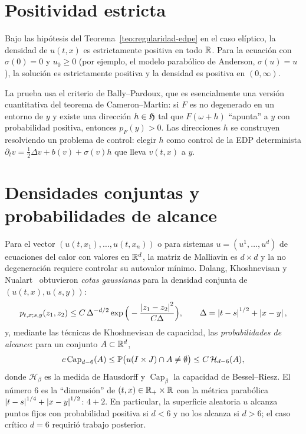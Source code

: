 \section{Positividad estricta}

\begin{teorema}
Bajo las hipótesis del Teorema~\ref{teo:regularidad-edpe} en el caso elíptico, la densidad de $u(t,x)$ es estrictamente positiva en todo $\R$.
Para la ecuación con $\sigma(0)=0$ y $u_0\ge0$ (por ejemplo, el modelo parabólico de Anderson,
$\sigma(u)=u$), la solución es estrictamente positiva y la densidad es positiva en $(0,\infty)$.
\end{teorema}

La prueba usa el criterio de Bally--Pardoux, que es esencialmente una versión cuantitativa
del teorema de Cameron--Martin: si $F$ es no degenerado en un entorno de $y$ y existe una
dirección $h\in\Hf$ tal que $F(\omega+h)$ ``apunta'' a $y$ con probabilidad positiva, entonces $p_F(y)>0$.
Las direcciones $h$ se construyen resolviendo un problema de control: elegir $h$ como control de la
EDP determinista $\partial_tv=\frac12\Delta v+b(v)+\sigma(v)h$ que lleva $v(t,x)$ a $y$.

\section{Densidades conjuntas y probabilidades de alcance}
Para el vector $(u(t,x_1),\dots,u(t,x_n))$ o para sistemas $u=(u^1,\dots,u^d)$ de ecuaciones del calor
con valores en $\R^d$, la matriz de Malliavin es $d\times d$ y la no degeneración requiere controlar su
autovalor mínimo. Dalang, Khoshnevisan y Nualart~\cite{DalangKhoshnevisanNualart07} obtuvieron \emph{cotas gaussianas} para la
densidad conjunta de $(u(t,x),u(s,y))$:
\[
  p_{t,x;s,y}(z_1,z_2)\le C\,\Delta^{-d/2}\exp\Big(-\frac{\abs{z_1-z_2}^2}{C\Delta}\Big),\qquad\Delta=\abs{t-s}^{1/2}+\abs{x-y},
\]
y, mediante las técnicas de Khoshnevisan de capacidad, las \emph{probabilidades de alcance}: para un
conjunto $A\subset\R^d$,
\[
  c\operatorname{Cap}_{d-6}(A)\le\P\big(u(I\times J)\cap A\ne\emptyset\big)\le C\,\mathcal H_{d-6}(A),
\]
donde $\mathcal H_\beta$ es la medida de Hausdorff y $\operatorname{Cap}_\beta$ la capacidad de Bessel--Riesz. El número 6 es
la ``dimensión'' de $(t,x)\in\R_+\times\R$ con la métrica parabólica $\abs{t-s}^{1/4}+\abs{x-y}^{1/2}$: $4+2$. En
particular, la superficie aleatoria $u$ alcanza puntos fijos con probabilidad positiva si $d<6$ y no
los alcanza si $d>6$; el caso crítico $d=6$ requirió trabajo posterior.


